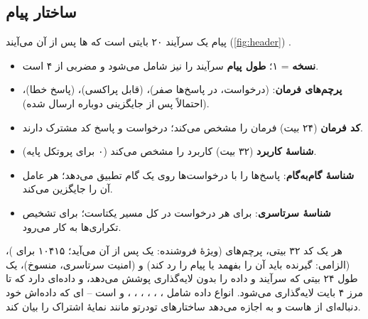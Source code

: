 \documentclass[11pt,a4paper]{article}
\begin{document}
\subsection{ساختار پیام}
پیام  یک سرآیند ۲۰ بایتی است که ها پس از آن می‌آیند (\cref{fig:header}) \cite{rfc6733}.
\begin{itemize}
  \item \textbf{نسخه} = ۱؛ \textbf{طول پیام} سرآیند را نیز شامل می‌شود و مضربی از ۴ است.
  \item \textbf{پرچم‌های فرمان}:  (درخواست، در پاسخ‌ها صفر)،  (قابل پراکسی)،  (پاسخ خطا)،
         (احتمالاً پس از جایگزینی دوباره ارسال شده).
  \item \textbf{کد فرمان} (۲۴ بیت) فرمان را مشخص می‌کند؛ درخواست و پاسخ کد مشترک دارند.
  \item \textbf{شناسهٔ کاربرد} (۳۲ بیت) کاربرد را مشخص می‌کند (۰ برای پروتکل پایه).
  \item \textbf{شناسهٔ گام‌به‌گام}: پاسخ‌ها را با درخواست‌ها روی یک گام تطبیق می‌دهد؛ هر عامل آن را جایگزین می‌کند.
  \item \textbf{شناسهٔ سرتاسری}: برای هر درخواست در کل مسیر یکتاست؛ برای تشخیص تکراری‌ها به کار می‌رود.
\end{itemize}
هر  یک کد ۳۲ بیتی، پرچم‌های  (ویژهٔ فروشنده: یک  پس از آن می‌آید؛ ۱۰۴۱۵ برای
)،  (الزامی: گیرنده باید آن را بفهمد یا پیام را رد کند) و  (امنیت سرتاسری، منسوخ)، یک طول ۲۴
بیتی که سرآیند و داده را بدون لایه‌گذاری پوشش می‌دهد، و داده‌ای دارد که تا مرز ۴ بایت لایه‌گذاری می‌شود. انواع داده شامل
، ، ، ، ، ،
 و \emph{} است -- ای که داده‌اش خود دنباله‌ای از هاست و به
 اجازه می‌دهد ساختارهای تودرتو مانند نمایهٔ اشتراک را بیان کند.

\begin{acnfigure}
  \caption{سرآیند  (چپ) و  (راست). هر ردیف ۳۲ بیت است.}
  \label{fig:header}
\end{acnfigure}
\end{document}
